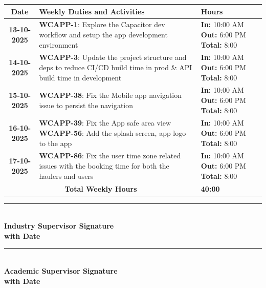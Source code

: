 \documentclass[a4paper,11pt]{article}
\begin{document}
\begin{tabularx}{\textwidth}{|c|>{\raggedright\arraybackslash}X|>{\centering\arraybackslash}m{3.5cm}|}
\hline
\rowcolor{gray!30}
\textbf{Date} & \textbf{Weekly Duties and Activities} & \textbf{Hours} \\
\hline
\textbf{13-10-2025} & \textbf{WCAPP-1}: Explore the Capacitor dev workflow and setup the app development environment & \textbf{In:} 10:00 AM \newline \textbf{Out:} 6:00 PM \newline \textbf{Total:} 8:00 \\
\hline
\textbf{14-10-2025} & \textbf{WCAPP-3}: Update the project structure and deps to reduce CI/CD build time in prod \& API build time in development & \textbf{In:} 10:00 AM \newline \textbf{Out:} 6:00 PM \newline \textbf{Total:} 8:00 \\
\hline
\textbf{15-10-2025} & \textbf{WCAPP-38}: Fix the Mobile app navigation issue to persist the navigation & \textbf{In:} 10:00 AM \newline \textbf{Out:} 6:00 PM \newline \textbf{Total:} 8:00 \\
\hline
\textbf{16-10-2025} & \textbf{WCAPP-39}: Fix the App safe area view \newline \textbf{WCAPP-56}: Add the splash screen, app logo to the app & \textbf{In:} 10:00 AM \newline \textbf{Out:} 6:00 PM \newline \textbf{Total:} 8:00 \\
\hline
\textbf{17-10-2025} & \textbf{WCAPP-86}: Fix the user time zone related issues with the booking time for both the haulers and users & \textbf{In:} 10:00 AM \newline \textbf{Out:} 6:00 PM \newline \textbf{Total:} 8:00 \\
\hline
\multicolumn{2}{|c|}{\textbf{Total Weekly Hours}} & \textbf{40:00} \\
\hline
\end{tabularx}

\vspace{3em}

\noindent
\begin{minipage}[t]{0.45\textwidth}
\rule{0.8\textwidth}{0.4pt} \\
\textbf{Industry Supervisor Signature} \\
\textbf{with Date}
\end{minipage}
\hfill
\begin{minipage}[t]{0.45\textwidth}
\rule{0.8\textwidth}{0.4pt} \\
\textbf{Academic Supervisor Signature} \\
\textbf{with Date}
\end{minipage}
\end{document}
